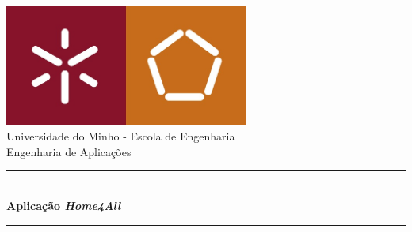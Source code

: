 \documentclass[a4paper]{article}
\begin{document}
\begin{titlepage}
\begin{center}


\includegraphics[width=0.6\textwidth]{images/logo.jpg}\\[0.5cm]

{\large Universidade do Minho - Escola de Engenharia}\\[0.5cm]

{\large Engenharia de Aplicações}\\[0.8cm]

\rule{\linewidth}{0.5mm} \\[0.4cm]
{ \huge \bfseries Aplicação \textit{Home4All}\\[0.4cm] }
\rule{\linewidth}{0.5mm} \\[1.5cm]


\end{center}
\end{titlepage}
\end{document}
